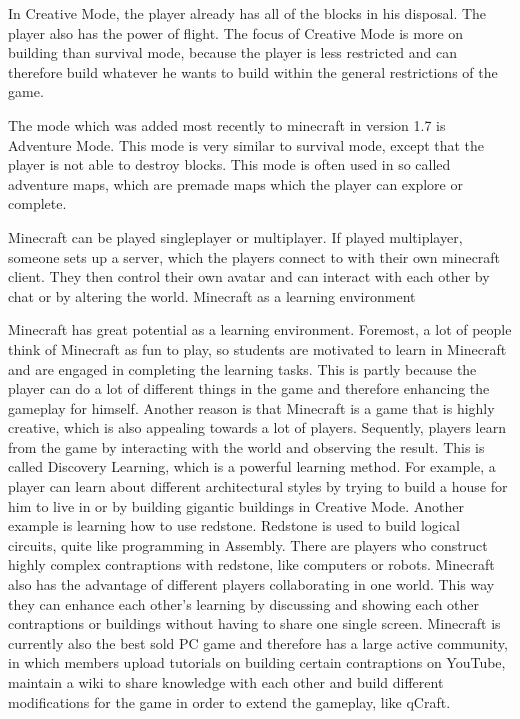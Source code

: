 \documentclass[12pt]{report} %
\begin{document}
In Creative Mode, the player already has all of the blocks in his disposal. The player also has the power of flight. The focus of Creative Mode is more on building than survival mode, because the player is less restricted and can therefore build whatever he wants to build within  the general restrictions of the game.

The mode which was added most recently to minecraft in version 1.7 is Adventure Mode. This mode is very similar to survival mode, except that the player is not able to destroy blocks. This mode is often used in so called adventure maps, which are premade maps which the player can explore or complete.

Minecraft can be played singleplayer or multiplayer. If played multiplayer, someone sets up a server, which the players connect to with their own minecraft client. They then control their own avatar and can interact with each other by chat or by altering the world.
Minecraft as a learning environment

Minecraft has great potential as a learning environment. Foremost, a lot of people think of Minecraft as fun to play, so students are motivated to learn in Minecraft and are engaged in completing the learning tasks. This is partly because the player can do a lot of different things in the game and therefore enhancing the gameplay for himself. Another reason is that Minecraft is a game that is highly creative, which is also appealing towards a lot of players. Sequently, players learn from the game by interacting with the world and observing the result. This is called Discovery Learning, which is a powerful learning method. For example, a player can learn about different architectural styles by trying to build a house for him to live in or by building gigantic buildings in Creative Mode. Another example is learning how to use redstone. Redstone is used to build logical circuits, quite like programming in Assembly. There are players who construct highly complex contraptions with redstone, like computers or robots. Minecraft also has the advantage of different players collaborating in one world. This way they can enhance each other's learning by discussing and showing each other contraptions or buildings without having to share one single screen. Minecraft is currently also the best sold PC game and therefore has a large active community, in which members upload tutorials on building certain contraptions on YouTube, maintain a wiki to share knowledge with each other and build different modifications for the game in order to extend the gameplay, like qCraft.
\end{document}
